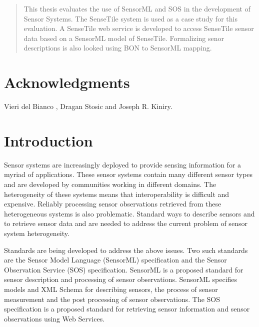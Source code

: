 \documentclass[]{final_report}
\begin{document}
\maketitle
\tableofcontents{}\newpage


\begin{abstract}
This thesis evaluates the use of SensorML and SOS in the development of Sensor Systems. The SenseTile system is used as a case study for this evaluation. A SenseTile web service is developed to access SenseTile sensor data based on a SensorML model of SenseTile. Formalizing senor descriptions is also looked using BON to SensorML mapping.

\end{abstract}




\newpage



\chapter*{Acknowledgments}

Vieri del Bianco , Dragan Stosic and Joseph R. Kiniry.


\chapter{Introduction}

Sensor systems are increasingly deployed to provide sensing information for a myriad of applications. These sensor systems contain many different sensor types and are developed by communities working in different domains. The heterogeneity of these systems means that interoperability is difficult and expensive. Reliably processing sensor observations retrieved from these heterogeneous systems is also problematic. Standard ways to describe sensors and to retrieve sensor data and are needed to address the current problem of sensor system heterogeneity. 

Standards are being developed to address the above issues. Two such standards are the Sensor Model Language (SensorML) specification\cite{SMLref} and the Sensor Observation Service (SOS) specification\cite{SOSref}. SensorML is a proposed standard for sensor description and processing of sensor observations. SensorML specifies models and XML Schema for describing sensors, the process of sensor measurement and the post processing of sensor observations. The SOS specification is a proposed standard for retrieving sensor information and sensor observations using Web Services. 
\end{document}
